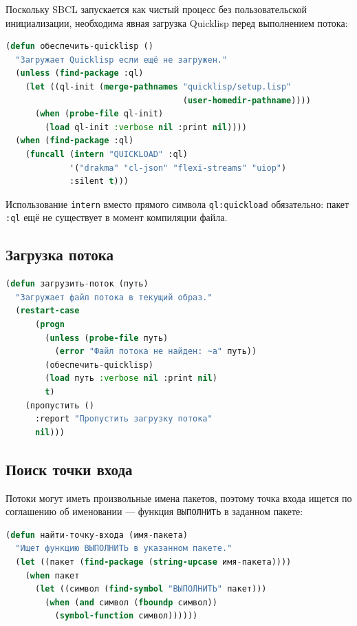\documentclass[11pt,a4paper]{article}
\begin{document}
Поскольку SBCL запускается как чистый процесс без пользовательской инициализации,
необходима явная загрузка Quicklisp перед выполнением потока:

\begin{lstlisting}[language=CommonLisp, caption={Инициализация Quicklisp в исполнителе}]
(defun обеспечить-quicklisp ()
  "Загружает Quicklisp если ещё не загружен."
  (unless (find-package :ql)
    (let ((ql-init (merge-pathnames "quicklisp/setup.lisp"
                                    (user-homedir-pathname))))
      (when (probe-file ql-init)
        (load ql-init :verbose nil :print nil))))
  (when (find-package :ql)
    (funcall (intern "QUICKLOAD" :ql)
             '("drakma" "cl-json" "flexi-streams" "uiop")
             :silent t)))
\end{lstlisting}

Использование \texttt{intern} вместо прямого символа \texttt{ql:quickload} обязательно:
пакет \texttt{:ql} ещё не существует в момент компиляции файла.

\subsection{Загрузка потока}

\begin{lstlisting}[language=CommonLisp, caption={Загрузка потока с обработкой условий}]
(defun загрузить-поток (путь)
  "Загружает файл потока в текущий образ."
  (restart-case
      (progn
        (unless (probe-file путь)
          (error "Файл потока не найден: ~a" путь))
        (обеспечить-quicklisp)
        (load путь :verbose nil :print nil)
        t)
    (пропустить ()
      :report "Пропустить загрузку потока"
      nil)))
\end{lstlisting}

\subsection{Поиск точки входа}

Потоки могут иметь произвольные имена пакетов, поэтому точка входа ищется
по соглашению об именовании — функция \texttt{ВЫПОЛНИТЬ} в заданном пакете:

\begin{lstlisting}[language=CommonLisp, caption={Динамический поиск точки входа}]
(defun найти-точку-входа (имя-пакета)
  "Ищет функцию ВЫПОЛНИТЬ в указанном пакете."
  (let ((пакет (find-package (string-upcase имя-пакета))))
    (when пакет
      (let ((символ (find-symbol "ВЫПОЛНИТЬ" пакет)))
        (when (and символ (fboundp символ))
          (symbol-function символ))))))
\end{lstlisting}
\end{document}
